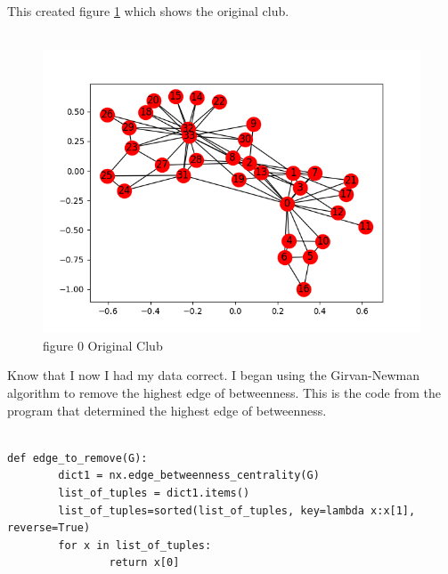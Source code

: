 \documentclass[10pt,letterpaper]{article}
\begin{document}
This created figure \ref{fig:kart0} which shows the original club.\\
\\
\begin{figure}[h!]
  \includegraphics[width=\linewidth]{karate00.png}
  \caption{figure 0 Original Club}
  \label{fig:kart0}
\end{figure}
 
Know that I now I had my data correct.  I began using the Girvan-Newman algorithm to remove the highest edge of betweenness.  This is the code from the program that determined the highest edge of betweenness.\\
\\

\begin{lstlisting}
def edge_to_remove(G):
        dict1 = nx.edge_betweenness_centrality(G)
        list_of_tuples = dict1.items()
        list_of_tuples=sorted(list_of_tuples, key=lambda x:x[1], reverse=True)
        for x in list_of_tuples:
                return x[0]
\end{lstlisting}
\end{document}
